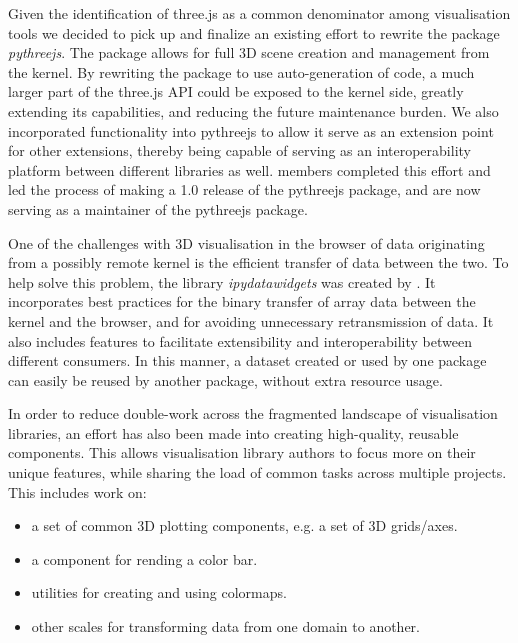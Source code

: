 \documentclass{deliverablereport}
\begin{document}
Given the identification of three.js as a common denominator among visualisation tools
we decided to pick up and finalize an existing effort to rewrite the package
\emph{pythreejs}. The package allows for full 3D scene creation and management from the
kernel. By rewriting the package to use auto-generation of code, a much larger
part of the three.js API could be exposed to the kernel side, greatly extending
its capabilities, and reducing the future maintenance burden. We also incorporated
functionality into pythreejs to allow it serve as an extension
point for other extensions, thereby being capable of serving as an interoperability
platform between different libraries as well.
\ODK members completed this effort and led the process of making a 1.0 release of the pythreejs package,
and are now serving as a maintainer of the pythreejs package.

One of the challenges with 3D visualisation in the browser of data originating from
a possibly remote kernel is the efficient transfer of data between the two. To help
solve this problem, the library \emph{ipydatawidgets} was created by \ODK. It incorporates
best practices for the binary transfer of array data between the kernel and the browser,
and for avoiding unnecessary retransmission of data. It also includes features to
facilitate extensibility and interoperability between different consumers. In this
manner, a dataset created or used by one package can easily be reused by another package,
without extra resource usage.

In order to reduce double-work across the fragmented landscape of visualisation
libraries, an effort has also been made into creating high-quality, reusable
components. This allows visualisation library authors to focus more on their
unique features, while sharing the load of common tasks across multiple projects.
This includes work on:

\begin{itemize}
\item a set of common 3D plotting components, e.g. a set of 3D grids/axes.
\item a component for rending a color bar.
\item utilities for creating and using colormaps.
\item other scales for transforming data from one domain to another.
\end{itemize}

\end{document}
